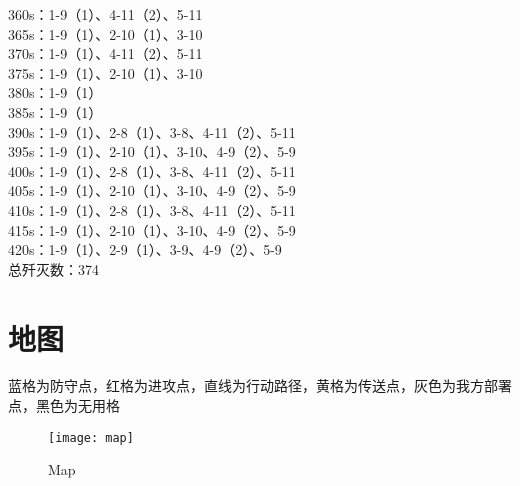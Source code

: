 \documentclass[a4paper,12pt]{article}
\begin{document}
		\indent 360s：1-9（1）、4-11（2）、5-11\\
		\indent 365s：1-9（1）、2-10（1）、3-10\\
		\indent 370s：1-9（1）、4-11（2）、5-11\\
		\indent 375s：1-9（1）、2-10（1）、3-10\\
		\indent 380s：1-9（1）\\
		\indent 385s：1-9（1）\\
		\indent 390s：1-9（1）、2-8（1）、3-8、4-11（2）、5-11\\
		\indent 395s：1-9（1）、2-10（1）、3-10、4-9（2）、5-9\\
		\indent 400s：1-9（1）、2-8（1）、3-8、4-11（2）、5-11\\
		\indent 405s：1-9（1）、2-10（1）、3-10、4-9（2）、5-9\\
		\indent 410s：1-9（1）、2-8（1）、3-8、4-11（2）、5-11\\
		\indent 415s：1-9（1）、2-10（1）、3-10、4-9（2）、5-9\\
		\indent 420s：1-9（1）、2-9（1）、3-9、4-9（2）、5-9\\
		\indent 总歼灭数：374
	\section{地图}
		蓝格为防守点，红格为进攻点，直线为行动路径，黄格为传送点，灰色为我方部署点，黑色为无用格
	\begin{figure}[p]
		\centering
		\texttt{[image: map]}
		\caption{Map}
	\end{figure}
\end{document}
